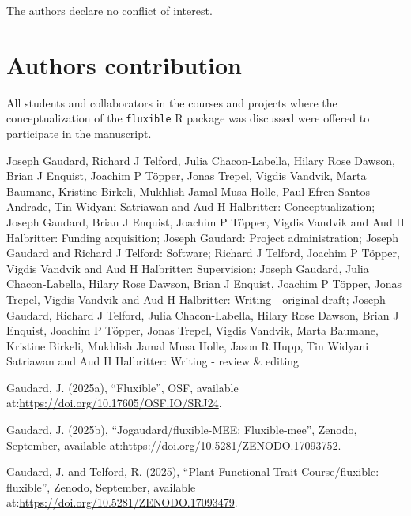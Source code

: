 \documentclass[
  letterpaper,
  DIV=11,
  numbers=noendperiod]{scrartcl}
\newlength{\cslhangindent}
\newenvironment{CSLReferences}[2] %
 {\begin{list}{}{%
  \setlength{\itemindent}{0pt}
  \setlength{\leftmargin}{0pt}
  \setlength{\parsep}{0pt}
  \ifodd #1
   \setlength{\leftmargin}{\cslhangindent}
   \setlength{\itemindent}{-1\cslhangindent}
  \fi
  \setlength{\itemsep}{#2\baselineskip}}}
 {\end{list}}
\begin{document}
The authors declare no conflict of interest.

\section*{Authors contribution}\label{authors-contribution}

All students and collaborators in the courses and projects where the
conceptualization of the \texttt{fluxible} R package was discussed were
offered to participate in the manuscript.

Joseph Gaudard, Richard J Telford, Julia Chacon-Labella, Hilary Rose
Dawson, Brian J Enquist, Joachim P Töpper, Jonas Trepel, Vigdis Vandvik,
Marta Baumane, Kristine Birkeli, Mukhlish Jamal Musa Holle, Paul Efren
Santos-Andrade, Tin Widyani Satriawan and Aud H Halbritter:
Conceptualization; Joseph Gaudard, Brian J Enquist, Joachim P Töpper,
Vigdis Vandvik and Aud H Halbritter: Funding acquisition; Joseph
Gaudard: Project administration; Joseph Gaudard and Richard J Telford:
Software; Richard J Telford, Joachim P Töpper, Vigdis Vandvik and Aud H
Halbritter: Supervision; Joseph Gaudard, Julia Chacon-Labella, Hilary
Rose Dawson, Brian J Enquist, Joachim P Töpper, Jonas Trepel, Vigdis
Vandvik and Aud H Halbritter: Writing - original draft; Joseph Gaudard,
Richard J Telford, Julia Chacon-Labella, Hilary Rose Dawson, Brian J
Enquist, Joachim P Töpper, Jonas Trepel, Vigdis Vandvik, Marta Baumane,
Kristine Birkeli, Mukhlish Jamal Musa Holle, Jason R Hupp, Tin Widyani
Satriawan and Aud H Halbritter: Writing - review \& editing

\label{refs}
\begin{CSLReferences}{1}{0}
Gaudard, J. (2025a), {``Fluxible''}, OSF, available
at:\url{https://doi.org/10.17605/OSF.IO/SRJ24}.

Gaudard, J. (2025b), {``Jogaudard/fluxible-{MEE}: Fluxible-mee''},
Zenodo, September, available
at:\url{https://doi.org/10.5281/ZENODO.17093752}.

Gaudard, J. and Telford, R. (2025),
{``Plant-{Functional-Trait-Course}/fluxible: fluxible''}, Zenodo,
September, available at:\url{https://doi.org/10.5281/ZENODO.17093479}.

\end{CSLReferences}
\end{document}
